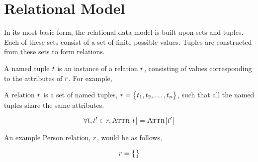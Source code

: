 \section{Relational Model}
	In its most basic form, the relational data model is built upon sets and tuples.  Each of these sets consist of a set of finite possible values.  Tuples are constructed from these sets to form relations.
	
	\begin{defn}
	\label{def:named-tuple}
		A named tuple $t$ is an instance of a relation $r$, consisting of values corresponding to the attributes of $r$.  For example,
	\end{defn}
	
	
	\begin{ex}
	\end{ex}
	
	\begin{defn}[Relation]
	\label{def:relation}
		A relation $r$ is a set of named tuples, $r = \bigl\{t_1, t_2, \dotsc, t_n\bigr\}$, such that all the named tuples share the same attributes.
		
		\[
			\forall t, t' \in r, \textsc{Attr}\bigl[t\bigr] = \textsc{Attr}\bigl[t'\bigr]
		\]
	\end{defn}
	
	\begin{ex}
		An example Person relation, $r$, would be as follows,
		
		\[
			r = \bigl\{
			\bigr\}
		\]
	\end{ex}
		
